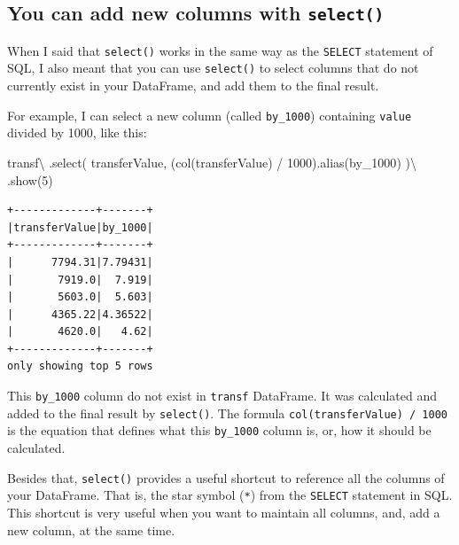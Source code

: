 \documentclass[
  11pt,
  letterpaper,
  DIV=11,
  numbers=noendperiod]{scrreprt}
\newenvironment{Shaded}{\begin{snugshade}}{\end{snugshade}}
\newcommand{\DecValTok}[1]{\textcolor[rgb]{0.68,0.00,0.00}{#1}}
\newcommand{\NormalTok}[1]{\textcolor[rgb]{0.00,0.23,0.31}{#1}}
\newcommand{\OperatorTok}[1]{\textcolor[rgb]{0.37,0.37,0.37}{#1}}
\newcommand{\StringTok}[1]{\textcolor[rgb]{0.13,0.47,0.30}{#1}}
\begin{document}
\hypertarget{you-can-add-new-columns-with-select}{%
\subsection{\texorpdfstring{You can add new columns with
\texttt{select()}}{You can add new columns with select()}}\label{you-can-add-new-columns-with-select}}

When I said that \texttt{select()} works in the same way as the
\texttt{SELECT} statement of SQL, I also meant that you can use
\texttt{select()} to select columns that do not currently exist in your
DataFrame, and add them to the final result.

For example, I can select a new column (called \texttt{by\_1000})
containing \texttt{value} divided by 1000, like this:

\begin{Shaded}
\begin{Highlighting}[]
\NormalTok{transf}\OperatorTok{\textbackslash{}}
\NormalTok{  .select(}
    \StringTok{\textquotesingle{}transferValue\textquotesingle{}}\NormalTok{,}
\NormalTok{    (col(}\StringTok{\textquotesingle{}transferValue\textquotesingle{}}\NormalTok{) }\OperatorTok{/} \DecValTok{1000}\NormalTok{).alias(}\StringTok{\textquotesingle{}by\_1000\textquotesingle{}}\NormalTok{)}
\NormalTok{  )}\OperatorTok{\textbackslash{}}
\NormalTok{  .show(}\DecValTok{5}\NormalTok{)}
\end{Highlighting}
\end{Shaded}

\begin{verbatim}
+-------------+-------+
|transferValue|by_1000|
+-------------+-------+
|      7794.31|7.79431|
|       7919.0|  7.919|
|       5603.0|  5.603|
|      4365.22|4.36522|
|       4620.0|   4.62|
+-------------+-------+
only showing top 5 rows
\end{verbatim}

This \texttt{by\_1000} column do not exist in \texttt{transf} DataFrame.
It was calculated and added to the final result by \texttt{select()}.
The formula
\texttt{col(\textquotesingle{}transferValue\textquotesingle{})\ /\ 1000}
is the equation that defines what this \texttt{by\_1000} column is, or,
how it should be calculated.

Besides that, \texttt{select()} provides a useful shortcut to reference
all the columns of your DataFrame. That is, the star symbol (\texttt{*})
from the \texttt{SELECT} statement in SQL. This shortcut is very useful
when you want to maintain all columns, and, add a new column, at the
same time.
\end{document}
